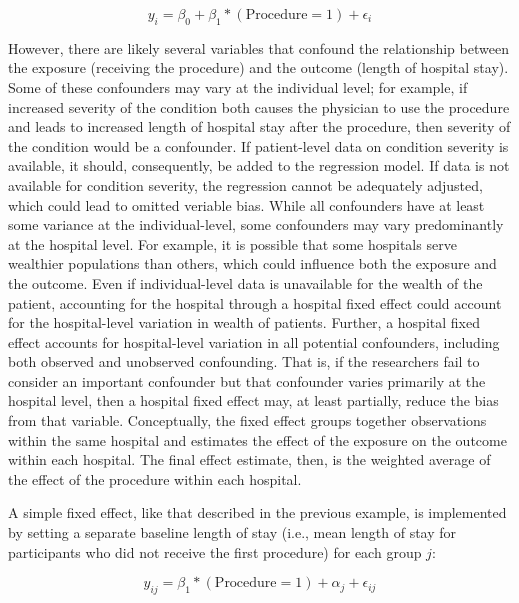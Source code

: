 \documentclass[12pt]{article}
\begin{document}
\begin{equation}\label{eq:NaiiveRegression}
  y_i = \beta_0 + \beta_1*(\textrm{Procedure} = 1) + \epsilon_i
\end{equation}

However, there are likely several variables that confound the relationship between the exposure (receiving the procedure) and the outcome (length of hospital stay). Some of these confounders may vary at the individual level; for example, if increased severity of the condition both causes the physician to use the procedure and leads to increased length of hospital stay after the procedure, then severity of the condition would be a confounder. If patient-level data on condition severity is available, it should, consequently, be added to the regression model. If data is not available for condition severity, the regression cannot be adequately adjusted, which could lead to omitted veriable bias. While all confounders have at least some variance at the individual-level, some confounders may vary predominantly at the hospital level. For example, it is possible that some hospitals serve wealthier populations than others, which could influence both the exposure and the outcome. Even if individual-level data is unavailable for the wealth of the patient, accounting for the hospital through a hospital fixed effect could account for the hospital-level variation in wealth of patients. Further, a hospital fixed effect accounts for hospital-level variation in all potential confounders, including both observed and unobserved confounding. That is, if the researchers fail to consider an important confounder but that confounder varies primarily at the hospital level, then a hospital fixed effect may, at least partially, reduce the bias from that variable. Conceptually, the fixed effect groups together observations within the same hospital and estimates the effect of the exposure on the outcome within each hospital. The final effect estimate, then, is the weighted average of the effect of the procedure within each hospital.

A simple fixed effect, like that described in the previous example, is implemented by setting a separate baseline length of stay (i.e., mean length of stay for participants who did not receive the first procedure) for each group $j$:

\begin{equation}\label{eq:SimpeFE}
  y_{ij} = \beta_1*(\textrm{Procedure} = 1) + \alpha_j + \epsilon_{ij}
\end{equation}
\end{document}
